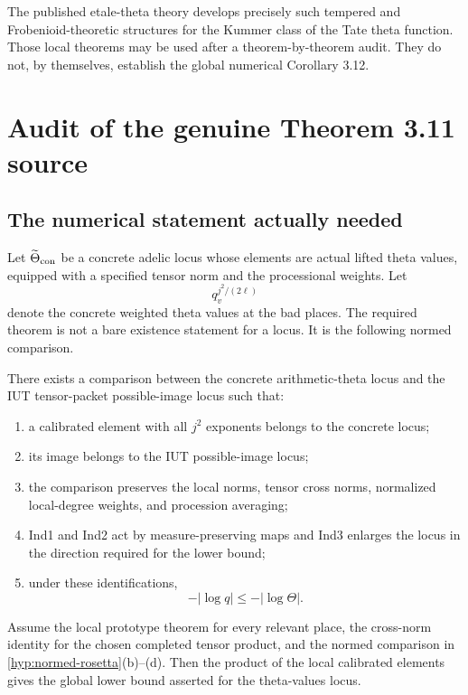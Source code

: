The published etale-theta theory develops precisely such tempered and Frobenioid-theoretic structures for the Kummer class of the Tate theta function.  Those local theorems may be used after a theorem-by-theorem audit.  They do not, by themselves, establish the global numerical Corollary 3.12.

\section{Audit of the genuine Theorem 3.11 source}

\subsection{The numerical statement actually needed}

Let $\widetilde\Theta_{\mathrm{con}}$ be a concrete adelic locus whose elements are actual lifted theta values, equipped with a specified tensor norm and the processional weights.  Let
\[
 q_v^{j^2/(2\ell)}
\]
denote the concrete weighted theta values at the bad places.  The required theorem is not a bare existence statement for a locus.  It is the following normed comparison.

\begin{hypothesis}\label{hyp:normed-rosetta}
There exists a comparison between the concrete arithmetic-theta locus and the IUT tensor-packet possible-image locus such that:
\begin{enumerate}[label=(\alph*)]
\item a calibrated element with all $j^2$ exponents belongs to the concrete locus;
\item its image belongs to the IUT possible-image locus;
\item the comparison preserves the local norms, tensor cross norms, normalized local-degree weights, and procession averaging;
\item Ind1 and Ind2 act by measure-preserving maps and Ind3 enlarges the locus in the direction required for the lower bound;
\item under these identifications,
\[
 -|\log q|\le -|\log\Theta|.
\]
\end{enumerate}
\end{hypothesis}

\begin{theorem}\label{thm:joshi-conditional}
Assume the local prototype theorem for every relevant place, the cross-norm identity for the chosen completed tensor product, and the normed comparison in \cref{hyp:normed-rosetta}(b)--(d).  Then the product of the local calibrated elements gives the global lower bound asserted for the theta-values locus.
\end{theorem}

